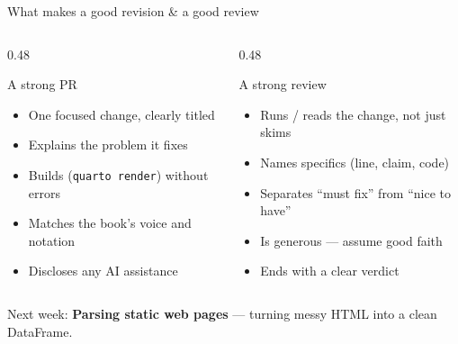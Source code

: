 \documentclass[9pt,aspectratio=169]{beamer}
\begin{document}
\begin{frame}{What makes a good revision \& a good review}
    \begin{columns}[T]
        \begin{column}{0.48\textwidth}
            \begin{block}{A strong PR}
                \begin{itemize}\small
                    \item One focused change, clearly titled
                    \item Explains the problem it fixes
                    \item Builds (\texttt{quarto render}) without errors
                    \item Matches the book's voice and notation
                    \item Discloses any AI assistance
                \end{itemize}
            \end{block}
        \end{column}
        \begin{column}{0.48\textwidth}
            \begin{block}{A strong review}
                \begin{itemize}\small
                    \item Runs / reads the change, not just skims
                    \item Names specifics (line, claim, code)
                    \item Separates ``must fix'' from ``nice to have''
                    \item Is generous --- assume good faith
                    \item Ends with a clear verdict
                \end{itemize}
            \end{block}
        \end{column}
    \end{columns}
    \vspace{0.5em}
    \centering\small Next week: \textbf{Parsing static web pages} --- turning messy HTML into a clean DataFrame.
\end{frame}
\end{document}
